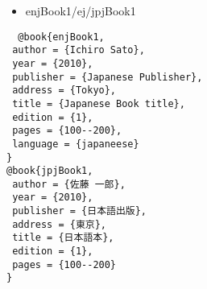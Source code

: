 \documentclass[9pt, twocolumn, a4paper]{jsarticle}
\begin{document}
\begin{bibunit}[jIEEEtran]
\begin{itemize}
 \item enjBook1/ej/jpjBook1 \cite{enjBook1/ej/jpjBook1}
\end{itemize}

\begin{lstlisting}
  @book{enjBook1,
 author = {Ichiro Sato},
 year = {2010},
 publisher = {Japanese Publisher},
 address = {Tokyo},
 title = {Japanese Book title},
 edition = {1},
 pages = {100--200},
 language = {japaneese}
}
@book{jpjBook1,
 author = {佐藤 一郎},
 year = {2010},
 publisher = {日本語出版},
 address = {東京},
 title = {日本語本},
 edition = {1},
 pages = {100--200}
}
\end{lstlisting}

{\footnotesize \putbib[samplebib]}
\end{bibunit}
\end{document}
